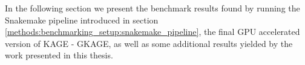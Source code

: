 In the following section we present the benchmark results found by running the Snakemake pipeline introduced in section \ref{methods:benchmarking_setup:snakemake_pipeline}, the final GPU accelerated version of KAGE - GKAGE, as well as some additional results yielded by the work presented in this thesis.

